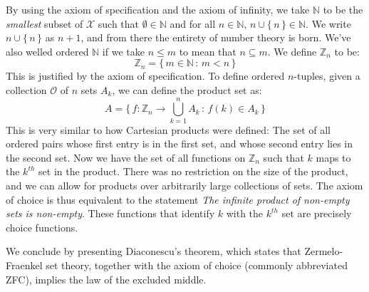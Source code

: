 \documentclass[crop=false,class=article]{standalone}                           %
\begin{document}
        By using the axiom of specification and the axiom of infinity, we take
        $\mathbb{N}$ to be the \textit{smallest} subset of $\mathcal{X}$ such
        that $\emptyset\in\mathbb{N}$ and for all $n\in\mathbb{N}$,
        $n\cup\{\,n\,\}\in\mathbb{N}$. We write $n\cup\{\,n\,\}$ as
        $n+1$, and from there the entirety of number theory is born. We've also
        welled ordered $\mathbb{N}$ if we take $n\leq{m}$ to mean that
        $n\subseteq{m}$. We define $\mathbb{Z}_{n}$ to be:
        \begin{equation}
            \mathbb{Z}_{n}=\{\,m\in\mathbb{N}\,:\,m<n\,\}
        \end{equation}
        This is justified by the axiom of specification. To define ordered
        $n$-tuples, given a collection $\mathcal{O}$ of $n$ sets $A_{k}$,
        we can define the product set as:
        \begin{equation}
            A=\{\,f:\mathbb{Z}_{n}\rightarrow\bigcup_{k=1}^{n}A_{k}\,:\,
                  f(k)\in{A}_{k}\,\}
        \end{equation}
        This is very similar to how Cartesian products were defined: The set of
        all ordered pairs whose first entry is in the first set, and whose
        second entry lies in the second set. Now we have the set of all
        functions on $\mathbb{Z}_{n}$ such that $k$ maps to the $k^{th}$ set
        in the product. There was no restriction on the size of the product,
        and we can allow for products over arbitrarily large collections of
        sets. The axiom of choice is thus equivalent to the statement
        \textit{The infinite product of non-empty sets is non-empty}. These
        functions that identify $k$ with the $k^{th}$ set are precisely
        choice functions.
        \par\hfill\par
        We conclude by presenting Diaconescu's theorem, which states that
        Zermelo-Fraenkel set theory, together with the axiom of choice
        (commonly abbreviated ZFC), implies the law of the excluded middle.
\end{document}
